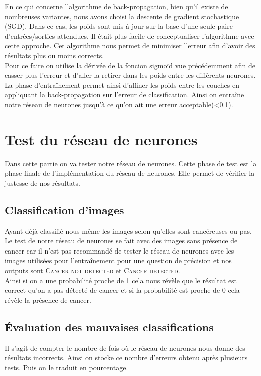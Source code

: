 \documentclass[a4paper,11pt]{report}
\theoremstyle{definition}
\begin{document}
En ce qui concerne l'algorithme de back-propagation, bien qu'il existe de nombreuses variantes, nous avons choisi la descente de gradient stochastique (SGD). Dans ce cas, les poids sont mis à jour sur la base d'une seule paire d'entrées/sorties attendues. Il était plus facile de conceptualiser l'algorithme avec cette approche. Cet algorithme nous permet de minimiser l'erreur afin d'avoir des résultats plus ou moins corrects.\\

Pour ce faire on utilise la dérivée de la foncion sigmoïd vue précédemment afin de casser plus l'erreur et d'aller la retirer dans les poids entre les différents neurones.\\

La phase d'entraînement permet ainsi d'affiner les poids entre les couches en appliquant la back-propagation sur l'erreur de classification. Ainsi on entraîne notre réseau de neurones jusqu'à ce qu'on ait une erreur acceptable(<0.1).


\section{Test du réseau de neurones}
Dans cette partie on va tester notre réseau de neurones. Cette phase de test est la phase finale de l’implémentation du réseau de neurones. Elle permet de vérifier la justesse de nos résultats. 

\subsection{Classification d'images}
Ayant déjà classifié nous même les images selon qu'elles sont cancéreuses ou pas. Le test de notre réseau de neurones se fait avec des images sans présence de cancer car il n'est pas recommandé de tester le réseau de neurones avec les images utilisées pour
l'entraînement pour une question de précision et nos outputs sont \textsc{Cancer not detected} et \textsc{Cancer detected}.\\

Ainsi si on a une probabilité proche de 1 cela nous révèle que le résultat est correct qu'on a pas détecté de cancer et si la probabilité est proche de 0 cela révèle la présence de cancer.

\subsection{Évaluation des mauvaises classifications}
Il s’agit de compter le nombre de fois où le réseau de neurones nous donne des résultats incorrects. Ainsi on stocke ce nombre d’erreurs obtenu après plusieurs tests. Puis on le traduit en pourcentage. 
\end{document}
